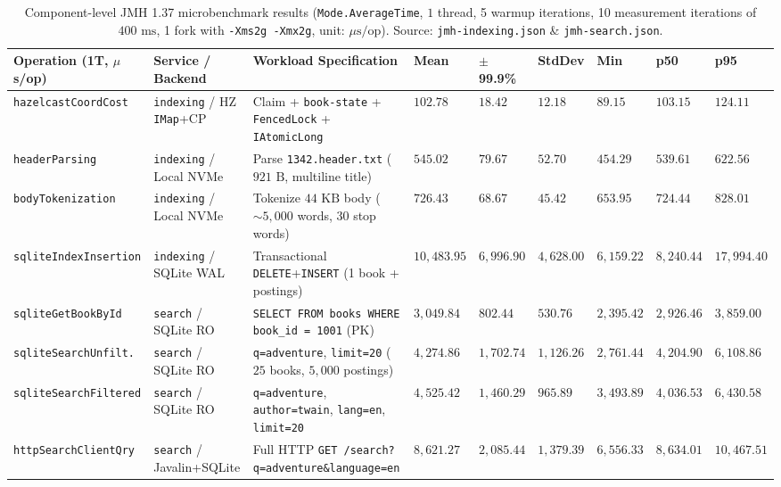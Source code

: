 \documentclass[10pt,a4paper]{article}
\begin{document}
\begin{table}[!htbp]
\centering
\caption{Component-level JMH 1.37 microbenchmark results (\texttt{Mode.AverageTime}, $1$ thread, 5 warmup iterations, 10 measurement iterations of $400\text{ ms}$, 1 fork with \texttt{-Xms2g -Xmx2g}, unit: $\mu\text{s/op}$). Source: \texttt{jmh-indexing.json} \& \texttt{jmh-search.json}.}
\label{tab:jmh_results}
\scriptsize
\setlength{\tabcolsep}{3pt}
\renewcommand{\arraystretch}{1.18}
\begin{tabularx}{\textwidth}{L{2.8cm} L{2.8cm} Y R{1.15cm} R{1.1cm} R{1.1cm} R{1.1cm} R{1.1cm} R{1.2cm}}
\toprule
\textbf{Operation (1T, $\mu$s/op)} & \textbf{Service / Backend} & \textbf{Workload Specification} & \textbf{Mean} & \textbf{$\pm$99.9\%} & \textbf{StdDev} & \textbf{Min} & \textbf{p50} & \textbf{p95} \\
\midrule
\texttt{hazelcastCoordCost} & \texttt{indexing} / HZ \texttt{IMap}+CP & Claim + \texttt{book-state} + \texttt{FencedLock} + \texttt{IAtomicLong} & $102.78$ & $18.42$ & $12.18$ & $89.15$ & $103.15$ & $124.11$ \\
\texttt{headerParsing} & \texttt{indexing} / Local NVMe & Parse \texttt{1342.header.txt} ($921\text{ B}$, multiline title) & $545.02$ & $79.67$ & $52.70$ & $454.29$ & $539.61$ & $622.56$ \\
\texttt{bodyTokenization} & \texttt{indexing} / Local NVMe & Tokenize $44\text{ KB}$ body ($\sim 5,000$ words, 30 stop words) & $726.43$ & $68.67$ & $45.42$ & $653.95$ & $724.44$ & $828.01$ \\
\texttt{sqliteIndexInsertion} & \texttt{indexing} / SQLite WAL & Transactional \texttt{DELETE}+\texttt{INSERT} (1 book + postings) & $10,483.95$ & $6,996.90$ & $4,628.00$ & $6,159.22$ & $8,240.44$ & $17,994.40$ \\
\midrule
\texttt{sqliteGetBookById} & \texttt{search} / SQLite RO & \texttt{SELECT FROM books WHERE book\_id = 1001} (PK) & $3,049.84$ & $802.44$ & $530.76$ & $2,395.42$ & $2,926.46$ & $3,859.00$ \\
\texttt{sqliteSearchUnfilt.} & \texttt{search} / SQLite RO & \texttt{q=adventure}, \texttt{limit=20} ($25$ books, $5,000$ postings) & $4,274.86$ & $1,702.74$ & $1,126.26$ & $2,761.44$ & $4,204.90$ & $6,108.86$ \\
\texttt{sqliteSearchFiltered} & \texttt{search} / SQLite RO & \texttt{q=adventure}, \texttt{author=twain}, \texttt{lang=en}, \texttt{limit=20} & $4,525.42$ & $1,460.29$ & $965.89$ & $3,493.89$ & $4,036.53$ & $6,430.58$ \\
\texttt{httpSearchClientQry} & \texttt{search} / Javalin+SQLite & Full HTTP \texttt{GET /search?q=adventure\&language=en} & $8,621.27$ & $2,085.44$ & $1,379.39$ & $6,556.33$ & $8,634.01$ & $10,467.51$ \\
\bottomrule
\end{tabularx}
\end{table}
\end{document}
